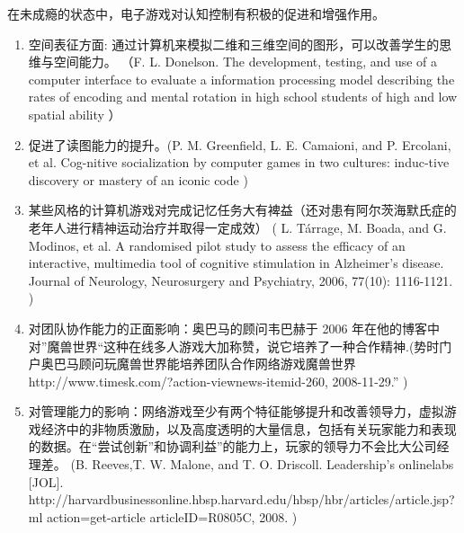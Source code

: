 在未成瘾的状态中，电子游戏对认知控制有积极的促进和增强作用。
\begin{enumerate}
\item 空间表征方面: 通过计算机来模拟二维和三维空间的图形，可以改善学生的思维与空间能力。
（F. L. Donelson. The development, testing, and use of a computer interface to evaluate a information processing model describing the rates of encoding and mental rotation in high school students of high and low spatial ability \cite{}）
\item 促进了读图能力的提升。(P. M. Greenfield, L. E. Camaioni, and P. Ercolani, et al. Cog-nitive socialization by computer games in two cultures: induc-tive discovery or mastery of an iconic code \cite{})

\item 某些风格的计算机游戏对完成记忆任务大有裨益（还对患有阿尔茨海默氏症的老年人进行精神运动治疗并取得一定成效）
                (  L. Tárrage, M. Boada, and G. Modinos, et al. A randomised pilot study to assess the efficacy of an interactive, multimedia tool of cognitive stimulation in Alzheimer’s disease. Journal of Neurology, Neurosurgery and Psychiatry, 2006, 77(10): 1116-1121. \cite{})
\item  对团队协作能力的正面影响：奥巴马的顾问韦巴赫于 2006 年在他的博客中对”魔兽世界“这种在线多人游戏大加称赞，说它培养了一种合作精神.(势时门户奥巴马顾问玩魔兽世界能培养团队合作网络游戏魔兽世界
http://www.timesk.com/?action-viewnews-itemid-260, 2008-11-29.” \cite{})

\item 对管理能力的影响：网络游戏至少有两个特征能够提升和改善领导力，虚拟游戏经济中的非物质激励，以及高度透明的大量信息，包括有关玩家能力和表现的数据。在“尝试创新”和协调利益”的能力上，玩家的领导力不会比大公司经理差。
(B. Reeves,T. W. Malone, and T. O. Driscoll. Leadership’s onlinelabs [JOL]. http://harvardbusinessonline.hbsp.harvard.edu/hbsp/hbr/articles/article.jsp?ml action=get-article articleID=R0805C, 2008. \cite{})
\end{enumerate}





